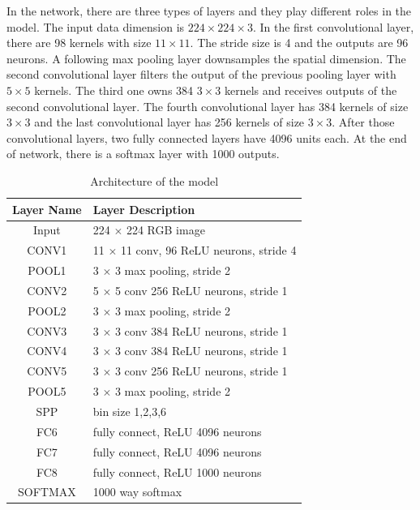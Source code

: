 In the network, there are three types of layers and they play different roles in the model. The input data dimension is $224\times224\times3$. In the first convolutional layer, there are 98 kernels with size $11\times11$. The stride size is 4 and the outputs are 96 neurons. A following max pooling layer downsamples the spatial dimension. The second convolutional layer filters the output of the previous pooling layer with $5\times5$ kernels. The third one owns 384 $3\times3$ kernels and receives outputs of the second convolutional layer. The fourth convolutional layer has 384 kernels of size $3\times3$ and the last convolutional layer has 256 kernels of size $3\times3$. After those convolutional layers, two fully connected layers have 4096 units each. At the end of network, there is a softmax layer with 1000 outputs.
\begin{table}[h]
\begin{center}
    \begin{tabular}{ | c | p{8cm} | }
    \hline
    Layer Name & Layer Description \\ \hline
    Input & 224 $\times$ 224 RGB image \\ \hline
    CONV1 & 11 $\times$ 11 conv, 96 ReLU neurons, stride 4 \\ \hline
    POOL1 & 3 $\times$ 3 max pooling, stride 2 \\ \hline
    CONV2 & 5 $\times$ 5 conv 256 ReLU neurons, stride 1 \\ \hline
    POOL2 & 3 $\times$ 3 max pooling, stride 2 \\ \hline
    CONV3 & 3 $\times$ 3 conv 384 ReLU neurons, stride 1 \\ \hline
    CONV4 & 3 $\times$ 3 conv 384 ReLU neurons, stride 1 \\ \hline
    CONV5 & 3 $\times$ 3 conv 256 ReLU neurons, stride 1 \\ \hline
    POOL5 & 3 $\times$ 3 max pooling, stride 2 \\ \hline
    SPP & bin size 1,2,3,6 \\ \hline
    FC6 & fully connect, ReLU 4096 neurons\\ \hline
    FC7 & fully connect, ReLU 4096 neurons\\ \hline
    FC8 & fully connect, ReLU 1000 neurons\\ \hline
    SOFTMAX & 1000 way softmax\\ \hline
    \end{tabular}
    \caption{Architecture of the model}
    \label{fig:NetPara}
\end{center}
\end{table}

















